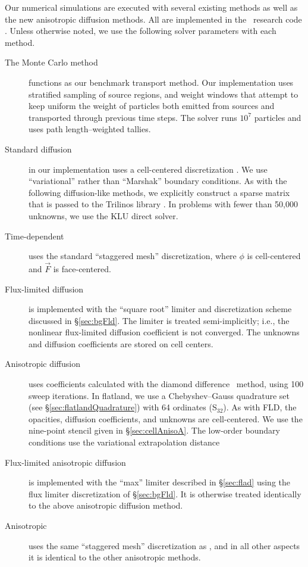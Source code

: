 Our numerical simulations are executed with several existing methods as well
as the new anisotropic diffusion methods. All
are implemented in the \pytrt\ research code \cite{Pytrt}. Unless otherwise
noted, we use the following solver parameters with each method.
\begin{description}
  \item[The Monte Carlo method] functions as our benchmark transport method. Our
    implementation uses stratified sampling of source regions, and weight
    windows that attempt to keep uniform the weight of particles both emitted
    from sources and transported through previous time steps. The solver runs
    $10^7$ particles and uses path length--weighted tallies.

  \item[Standard diffusion] in our implementation uses a cell-centered
    discretization \cite{Dud1976}.  We use ``variational'' rather than
    ``Marshak'' boundary conditions.
    As with the following diffusion-like methods, we explicitly
    construct a sparse matrix that is passed to the Trilinos library
    \cite{Her2003}.  In problems with fewer than 50,000 unknowns, we use the KLU
    direct solver. 

  \item[Time-dependent \Pone] uses the standard ``staggered mesh''
    discretization, where $\phi$ is cell-centered and $\vec{F}$ is
    face-centered.

  \item[Flux-limited diffusion] is implemented with the ``square root'' limiter
    and discretization scheme discussed in \S\ref{sec:bgFld}. The limiter is
    treated semi-implicitly; i.e., the nonlinear flux-limited diffusion
    coefficient is not converged. The unknowns and diffusion coefficients are
    stored on cell centers.

  \item[Anisotropic diffusion] uses
    coefficients calculated with the diamond difference \SN\ method, using 100
    sweep iterations. In flatland, we use a Chebyshev--Gauss quadrature set
    (see \S\ref{sec:flatlandQuadrature}) with 64 ordinates (S$_{32}$).
    As with FLD, the opacities, diffusion coefficients, and unknowns are
    cell-centered. We use the nine-point stencil given in
    \S\ref{sec:cellAnisoA}. The low-order boundary conditions use the
    variational extrapolation distance 

  \item[Flux-limited anisotropic diffusion] is implemented with the
    ``max'' limiter described in \S\ref{sec:flad} using the flux limiter
    discretization of \S\ref{sec:bgFld}. It is otherwise treated identically to
    the above anisotropic diffusion method.

  \item[Anisotropic \Pone] uses the same ``staggered mesh'' discretization
    as \Pone, and in all other aspects it is identical to the other anisotropic
    methods.

\end{description}

